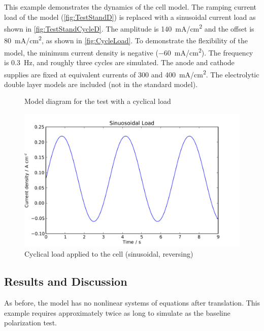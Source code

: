This example demonstrates the dynamics of the cell model.  The ramping current load of the  model (\autoref{fig:TestStandD}) is replaced with a sinusoidal current load as shown in \autoref{fig:TestStandCycleD}.  The amplitude is \SI{140}{mA/cm^2} and the offset is \SI{80}{mA/cm^2}, as shown in \autoref{fig:CycleLoad}.  To demonstrate the flexibility of the model, the minimum current density is negative (\SI{-60}{mA/cm^2}).  The frequency is \SI{0.3}{Hz}, and roughly three cycles are simulated.  The anode and cathode supplies are fixed at equivalent currents of 300 and \SI{400}{mA/cm^2}.  The electrolytic double layer models are included (not in the standard model).

\begin{figure}[htbp]
  \caption{Model diagram for the test with a cyclical load}
  \label{fig:TestStandCycleD}
\end{figure}

\begin{figure}[htbp]
  \includegraphics[width=\linewidth]{Results/Cell/Model/Cycle/Load}%
  \caption{Cyclical load applied to the cell (sinusoidal, reversing)}%
  \label{fig:CycleLoad}
\end{figure}

\subsection{Results and Discussion}



As before, the model has no nonlinear systems of equations after translation.  This example requires approximately twice as long to simulate as the baseline polarization test.  

